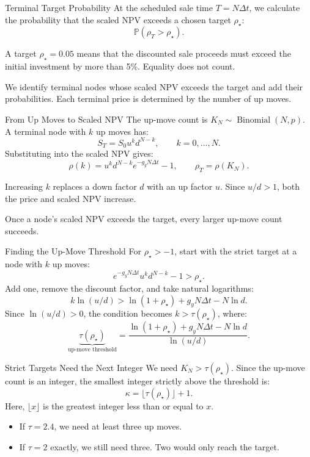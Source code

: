 \documentclass[aspectratio=169,11pt]{beamer}
\newcommand{\Pmeasure}{\mathbb{P}}
\begin{document}
\begin{frame}{Terminal Target Probability}
At the scheduled sale time $T=N\Delta t$, we calculate the probability
  that the scaled NPV exceeds a chosen target $\rho_\star$:
  \[
    \Pmeasure(\rho_T>\rho_\star).
  \]

  A target $\rho_\star=0.05$ means that the discounted sale proceeds must
  exceed the initial investment by more than 5\%. Equality does not count.

  \vspace{0.7em}
  We identify terminal nodes whose scaled NPV exceeds the target and add their
  probabilities. Each terminal price is determined by the number of up moves.
\end{frame}

\begin{frame}{From Up Moves to Scaled NPV}
The up-move count is $K_N\sim\operatorname{Binomial}(N,p)$.
  A terminal node with $k$ up moves has:
  \[
    S_T=S_0u^kd^{N-k},\qquad k=0,\ldots,N.
  \]
  Substituting into the scaled NPV gives:
  \[
    \rho(k)=u^kd^{N-k}e^{-g_yN\Delta t}-1,
    \qquad \rho_T=\rho(K_N).
  \]

  Increasing $k$ replaces a down factor $d$ with an up factor $u$.
  Since $u/d>1$, both the price and scaled NPV increase.

  \vspace{0.5em}
  Once a node's scaled NPV exceeds the target, every larger up-move count succeeds.
\end{frame}

\begin{frame}{Finding the Up-Move Threshold}
For $\rho_\star>-1$, start with the strict target at a node with $k$ up moves:
  \[
    e^{-g_yN\Delta t}u^kd^{N-k}-1>\rho_\star.
  \]
  Add one, remove the discount factor, and take natural logarithms:
  \[
    k\ln(u/d)>\ln(1+\rho_\star)+g_yN\Delta t-N\ln d.
  \]
  Since $\ln(u/d)>0$, the condition becomes $k>\tau(\rho_\star)$, where:
  \[
    \underbrace{\tau(\rho_\star)}_{\text{up-move threshold}}
    =\frac{\ln(1+\rho_\star)+g_yN\Delta t-N\ln d}{\ln(u/d)}.
  \]
\end{frame}

\begin{frame}{Strict Targets Need the Next Integer}
We need $K_N>\tau(\rho_\star)$. Since the up-move count is an integer,
  the smallest integer strictly above the threshold is:
  \[
    \kappa=\lfloor\tau(\rho_\star)\rfloor+1.
  \]
  Here, $\lfloor x\rfloor$ is the greatest integer less than or equal to $x$.

  \vspace{0.7em}
  \begin{itemize}\setlength{\itemsep}{0.7em}
    \item If $\tau=2.4$, we need at least three up moves.
    \item If $\tau=2$ exactly, we still need three. Two would only
      reach the target.
  \end{itemize}
\end{frame}
\end{document}
